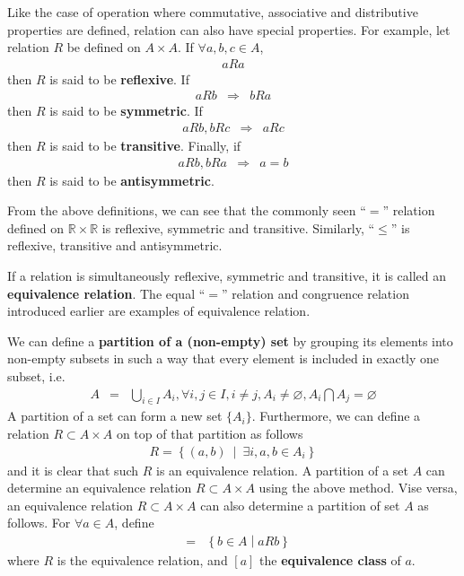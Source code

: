 Like the case of operation where commutative, associative and distributive properties are defined, relation can also have special properties. For example, let relation $R$ be defined on $A \times A$. If $\forall a,b,c \in A$,
\begin{eqnarray}
	aRa \nonumber
\end{eqnarray}
then $R$ is said to be \textbf{reflexive}. If
\begin{eqnarray}
	aRb &\Rightarrow& bRa \nonumber
\end{eqnarray}
then $R$ is said to be \textbf{symmetric}. If
\begin{eqnarray}
	aRb, bRc &\Rightarrow& aRc \nonumber 
\end{eqnarray}
then $R$ is said to be \textbf{transitive}. Finally, if
\begin{eqnarray}
	aRb, bRa &\Rightarrow& a=b \nonumber 
\end{eqnarray}
then $R$ is said to be \textbf{antisymmetric}.

From the above definitions, we can see that the commonly seen ``$=$'' relation defined on $\mathbb{R}\times\mathbb{R}$ is reflexive, symmetric and transitive. Similarly, ``$\leq$'' is reflexive, transitive and antisymmetric.

If a relation is simultaneously reflexive, symmetric and transitive, it is called an \textbf{equivalence relation}. The equal ``$=$'' relation and congruence relation introduced earlier are examples of equivalence relation.

We can define a \textbf{partition of a (non-empty) set} by grouping its elements into non-empty subsets in such a way that every element is included in exactly one subset, i.e.
\begin{eqnarray}
	A &=& \bigcup_{i\in I}A_i, \forall i, j \in I, i\neq j, A_i \neq \varnothing, A_i \bigcap A_j = \varnothing \nonumber
\end{eqnarray}
A partition of a set can form a new set $\{A_i\}$. Furthermore, we can define a relation $R\subset A \times A$ on top of that partition as follows
\begin{eqnarray}
	R = \left\{(a,b)~\middle|~\exists i, a,b \in A_i\right\} \nonumber
\end{eqnarray}
and it is clear that such $R$ is an equivalence relation. A partition of a set $A$ can determine an equivalence relation $R\subset A\times A$ using the above method. Vise versa, an equivalence relation $R\subset A\times A$ can also determine a partition of set $A$ as follows. For $\forall a \in A$, define
\begin{eqnarray}
	[a] &=& \left\{b \in A\middle| aRb \right\} \nonumber
\end{eqnarray}
where $R$ is the equivalence relation, and $[a]$ the \textbf{equivalence class} of $a$. 

